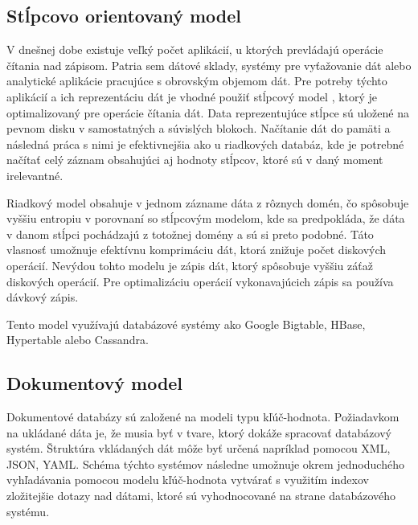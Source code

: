 \documentclass[11pt,twoside,a4paper]{book}
\begin{document}
\subsection{Stĺpcovo orientovaný model}


V dnešnej dobe existuje veľký počet aplikácií, u ktorých prevládajú operácie čítania nad zápisom. Patria sem dátové sklady, systémy pre vyťažovanie dát alebo analytické aplikácie pracujúce s obrovským objemom dát. Pre potreby týchto aplikácií a ich reprezentáciu dát je vhodné použiť stĺpcový model \cite{abadi2009column, abadi2009}, ktorý je optimalizovaný pre operácie čítania dát. Data reprezentujúce stĺpce sú uložené na pevnom disku v samostatných a súvislých blokoch. Načítanie dát do pamäti a následná práca s nimi je efektivnejšia ako u riadkových databáz, kde je potrebné načítať celý záznam obsahujúci aj hodnoty stĺpcov, ktoré sú v daný moment irelevantné.

Riadkový model obsahuje v jednom zázname dáta z rôznych domén, čo spôsobuje vyššiu entropiu v porovnaní so stĺpcovým modelom, kde sa predpokláda, že dáta v danom stĺpci pochádzajú z totožnej domény a sú si preto podobné. Táto vlasnosť umožnuje efektívnu komprimáciu dát, ktorá znižuje počet diskových operácií. Nevýdou tohto modelu je zápis dát, ktorý spôsobuje vyššiu záťaž diskových operácií. Pre optimalizáciu operácií vykonavajúcich zápis sa používa dávkový zápis.


Tento model využívajú databázové systémy ako Google Bigtable, HBase, Hypertable alebo Cassandra.

\subsection{Dokumentový model}

Dokumentové databázy sú založené na modeli typu kľúč-hodnota. Požiadavkom na ukládané dáta je, že musia byť v tvare, ktorý dokáže spracovať databázový systém. Štruktúra vkládaných dát môže byť určená napríklad pomocou XML, JSON, YAML. Schéma týchto systémov následne umožnuje okrem jednoduchého vyhľadávania pomocou modelu kľúč-hodnota vytvárať s využitím indexov zložitejšie dotazy nad dátami, ktoré sú vyhodnocované na strane databázového systému. 
\end{document}
